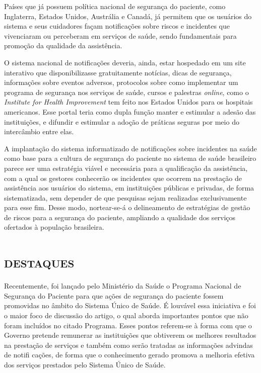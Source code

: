 \documentclass{article}
\begin{document}
Países que já possuem política nacional de segurança do paciente, como
Inglaterra, Estados
Unidos, Austrália e Canadá, já permitem que os usuários do sistema e seus
cuidadores façam
notificações sobre riscos e incidentes que vivenciaram ou perceberam em serviços
de saúde,
sendo fundamentais para promoção da qualidade da assistência.

O sistema nacional de notificações deveria, ainda, estar hospedado em um site
interativo
que disponibilizasse gratuitamente notícias, dicas de segurança, informações
sobre eventos
adversos, protocolos sobre como implementar um programa de segurança nos
serviços de saúde,
cursos e palestras \textit{online}, como o \textit{Institute for Health
Improvement}
tem feito nos Estados Unidos para os hospitais americanos. Esse
portal teria como dupla função manter e estimular a adesão das instituições, e
difundir e
estimular a adoção de práticas seguras por meio do intercâmbio entre elas.

A implantação do sistema informatizado de notificações sobre incidentes na saúde
como base
para a cultura de segurança do paciente no sistema de saúde brasileiro parece
ser uma
estratégia viável e necessária para a qualificação da assistência, com a qual os
gestores
conhecerão os incidentes que ocorrem na prestação de assistência aos usuários do
sistema, em
instituições públicas e privadas, de forma sistematizada, sem depender de que
pesquisas
sejam realizadas exclusivamente para esse fim. Desse modo, nortear-se-á o
delineamento de
estratégias de gestão de riscos para a segurança do paciente, ampliando a
qualidade dos
serviços ofertados à população brasileira.

\section{\textsc{destaques}}
Recentemente, foi lançado pelo Ministério da Saúde o Programa Nacional de
Segurança do
Paciente para que ações de segurança do paciente fossem promovidas no âmbito do
Sistema
Único de Saúde. É louvável essa iniciativa e foi o maior foco de discussão do
artigo, o qual
aborda importantes pontos que não foram incluídos no citado Programa. Esses
pontos
referem-se à forma com que o Governo pretende remunerar as instituições que
obtiverem os
melhores resultados na prestação de serviços e também como serão tratadas as
informações
advindas de notifi cações, de forma que o conhecimento gerado promova a melhoria
efetiva dos
serviços prestados pelo Sistema Único de Saúde.
\end{document}
